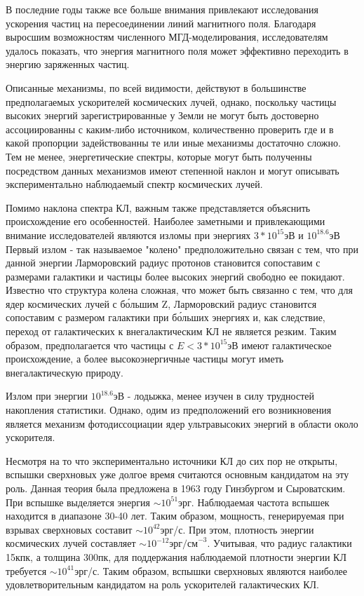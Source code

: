 В последние годы также все больше внимания привлекают исследования ускорения частиц на пересоединении линий магнитного поля. Благодаря выросшим возможностям численного МГД-моделирования, исследователям удалось показать, что энергия магнитного поля может эффективно переходить в энергию заряженных частиц.

Описанные механизмы, по всей видимости, действуют в большинстве предполагаемых ускорителей космических лучей, однако, поскольку частицы высоких энергий зарегистрированные у Земли не могут быть достоверно ассоциированны с каким-либо источником, количественно проверить где и в какой пропорции задействованны те или иные механизмы достаточно сложно. Тем не менее, энергетические спектры, которые могут быть полученны посредством данных механизмов имеют степенной наклон и могут описывать экспериментально наблюдаемый спектр космических лучей.

Помимо наклона спектра КЛ, важным также представляется объяснить происхождение его особенностей. Наиболее заметными и привлекающими внимание исследователей являются изломы при энергиях $3*10^{15}$эВ и $10^{18.6}$эВ  Первый излом - так называемое "колено" предположительно связан с тем, что при данной энергии Ларморовский радиус протонов становится сопоставим с размерами галактики и частицы более высоких энергий свободно ее покидают. Известно что структура колена сложная, что может быть связанно с тем, что для ядер космических лучей с б\'ольшим Z, Ларморовский радиус становится сопоставим с размером галактики при б\'ольших энергиях и, как следствие, переход от галактических к внегалактическим КЛ не является резким. Таким образом, предполагается что частицы с $E < 3*10^{15}$эВ имеют галактическое происхождение, а более высокоэнергичные частицы могут иметь внегалактическую природу. 

Излом при энергии $10^{18.6}$эВ - лодыжка, менее изучен в силу трудностей накопления статистики. Однако, одим из предположений его возникновения является механизм фотодиссоциации ядер ультравысоких энергий в области около ускорителя\cite{Unger_2015}.

Несмотря на то что экспериментально источники КЛ до сих пор не открыты, вспышки сверхновых уже долгое время считаются основным кандидатом на эту роль. Данная теория была предложена в 1963 году Гинзбургом и Сыроватским. При вспышке выделяется энергия $\sim10^{51}$эрг. Наблюдаемая частота вспышек находится в диапазоне 30-40 лет. Таким образом, мощность, генерируемая при взрывах сверхновых составит $\sim10^{42}$эрг/с. При этом, плотность энергии космических лучей составляет $\sim10^{-12}\text{эрг/см}^{-3}$. Учитывая, что радиус галактики 15кпк, а толщина 300пк, для поддержания наблюдаемой плотности энергии КЛ требуется  $\sim10^{41}$эрг/с. Таким образом, вспышки сверхновых являются наиболее удовлетворительным кандидатом на роль ускорителей галактических КЛ.

